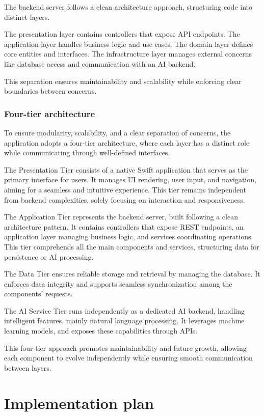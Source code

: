 \documentclass{article}
\begin{document}
The backend server follows a clean architecture approach, structuring code into distinct layers.

The presentation layer contains controllers that expose API endpoints.
The application layer handles business logic and use cases.
The domain layer defines core entities and interfaces.
The infrastructure layer manages external concerns like database access and communication with an AI backend.

This separation ensures maintainability and scalability while enforcing clear boundaries between concerns.

\subsubsection{Four-tier architecture}

To ensure modularity, scalability, and a clear separation of concerns, the application adopts a four-tier architecture, where each layer has a distinct role while communicating through well-defined interfaces.

The Presentation Tier consists of a native Swift application that serves as the primary interface for users.
It manages UI rendering, user input, and navigation, aiming for a seamless and intuitive experience.
This tier remains independent from backend complexities, solely focusing on interaction and responsiveness.

The Application Tier represents the backend server, built following a clean architecture pattern.
It contains controllers that expose REST endpoints, an application layer managing business logic, and services coordinating operations.
This tier comprehends all the main components and services, structuring data for persistence or AI processing.

The Data Tier ensures reliable storage and retrieval by managing the database.
It enforces data integrity and supports seamless synchronization among the components' requests.

The AI Service Tier runs independently as a dedicated AI backend, handling intelligent features, mainly natural language processing.
It leverages machine learning models, and exposes these capabilities through APIs.

This four-tier approach promotes maintainability and future growth, allowing each component to evolve independently while ensuring smooth communication between layers.

\section{Implementation plan}
\end{document}
